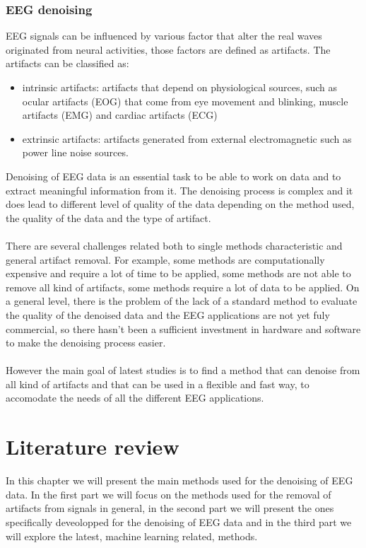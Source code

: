 \documentclass[a4paper]{sapthesis}
\begin{document}
\subsection{EEG denoising}
EEG signals can be influenced by various factor that alter the real waves 
originated from neural activities, those factors are defined as artifacts. 
The artifacts can be classified as\cite{EEG artifact}: 
\begin{itemize}
    \item intrinsic artifacts:
    artifacts that depend on physiological sources, such as ocular artifacts (EOG)
    that come from eye movement and blinking, muscle artifacts (EMG) and
     cardiac artifacts (ECG)
    \item extrinsic artifacts: artifacts generated from external electromagnetic 
    such as power line noise
    sources.
\end{itemize}
Denoising of EEG data is an essential task to be able to work on data and to
extract meaningful information from it. The denoising process is complex and
it does lead to different level of quality of the data depending on the 
method used, the quality of the data and the type of artifact.\\ \\
There are several challenges\cite{denoising challenges} related both 
to single methods characteristic and general artifact removal.
For example, some methods are computationally expensive and require a lot
of time to be applied, some methods are not able to remove all kind of
artifacts, some methods require a lot of data to be applied. On a general
level, there is the problem of the lack of a standard method to evaluate
the quality of the denoised data and the EEG applications are not 
yet fuly commercial, so there hasn't been a sufficient investment in
hardware and software to make the denoising process easier.\\ \\
However the main goal of latest studies is to find a method that can
denoise from all kind of artifacts and that can be used in a flexible
and fast way, to accomodate the needs of all the different EEG applications.
\chapter{Literature review}
In this chapter we will present the main methods used for the denoising
of EEG data. In the first part we will focus on the methods used for the
removal of artifacts from signals in general, in the second part we will
present the ones specifically deveolopped for the denoising of EEG data and in the third
part we will explore the latest, machine learning related, methods.
\end{document}
